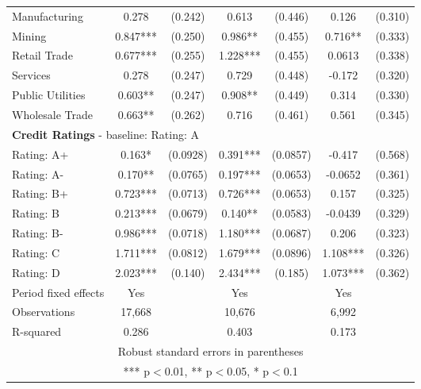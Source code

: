 \documentclass[12pt]{article}
\begin{document}
\begin{table}[H]
{\begin{tabular}{lcccccc}
    Manufacturing  & 0.278 & (0.242) & 0.613 & (0.446) & 0.126 & (0.310) \\
    Mining & 0.847*** & (0.250) & 0.986** & (0.455) & 0.716** & (0.333) \\
    Retail Trade  & 0.677*** & (0.255) & 1.228*** & (0.455) & 0.0613 & (0.338) \\
    Services & 0.278 & (0.247) & 0.729 & (0.448) & -0.172 & (0.320) \\
    Public Utilities & 0.603** & (0.247) & 0.908** & (0.449) & 0.314 & (0.330) \\
    Wholesale Trade & 0.663** & (0.262) & 0.716 & (0.461) & 0.561 & (0.345)  \vspace{3mm} \\
    \multicolumn{7}{l}{\textbf{Credit Ratings} - baseline: Rating: A} \\
    Rating: A+ & 0.163* & (0.0928) & 0.391*** & (0.0857) & -0.417 & (0.568) \\
    Rating: A- &  0.170** & (0.0765) & 0.197*** & (0.0653) & -0.0652 & (0.361) \\
    Rating: B+ & 0.723*** & (0.0713) & 0.726*** & (0.0653) & 0.157 & (0.325) \\
    Rating: B & 0.213*** & (0.0679) & 0.140** & (0.0583) & -0.0439 & (0.329) \\
    Rating: B- & 0.986*** & (0.0718) & 1.180*** & (0.0687) & 0.206 & (0.323) \\
    Rating: C  & 1.711*** & (0.0812) & 1.679*** & (0.0896) & 1.108*** & (0.326) \\
    Rating: D & 2.023*** & (0.140) & 2.434*** & (0.185) & 1.073*** & (0.362)  \\
    \midrule
    Period fixed effects & Yes & & Yes & & Yes & \\
    Observations & 17,668 & & 10,676 & & 6,992 & \\
    R-squared & 0.286 & & 0.403 & & 0.173 & \\
    \bottomrule
    \multicolumn{7}{c}{Robust standard errors in parentheses} \\
    \multicolumn{7}{c}{*** p$<$0.01, ** p$<$0.05, * p$<$0.1} \\
    \end{tabular}%
    }
\end{table}
\end{document}
